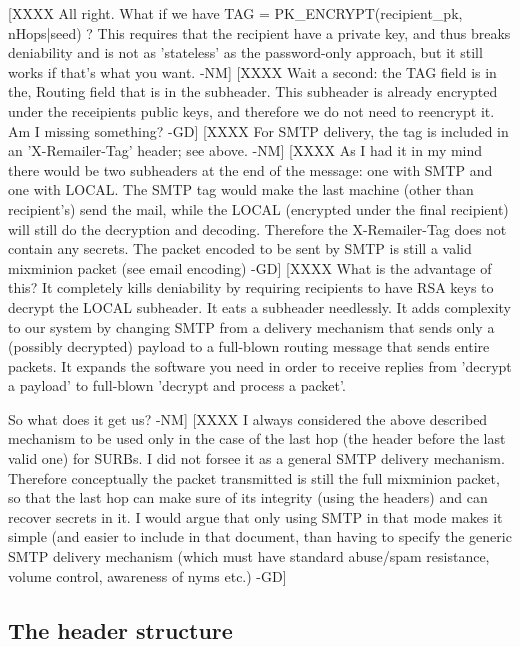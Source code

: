 [XXXX All right.  What if we have 
         TAG = PK_ENCRYPT(recipient_pk, nHops|seed) ?  
      This requires
      that the recipient have a private key, and thus breaks
      deniability and is not as 'stateless' as the password-only
      approach, but it still works if that's what you want.  -NM]
[XXXX Wait a second: the TAG field is in the, Routing field that is in the 
      subheader. This subheader is already encrypted under the receipients
      public keys, and therefore we do not need to reencrypt it.
      Am I missing something? -GD]
[XXXX For SMTP delivery, the tag is included in an 'X-Remailer-Tag'
      header; see above. -NM]
[XXXX As I had it in my mind there would be two subheaders at the end
         of the message: one with SMTP and one with LOCAL. The SMTP
         tag would make the last machine (other than recipient's) send
         the mail, while the LOCAL (encrypted under the final
         recipient) will still do the decryption and
         decoding. Therefore the X-Remailer-Tag does not contain any
         secrets. The packet encoded to be sent by SMTP is still a
         valid mixminion packet (see email encoding) -GD]
[XXXX What is the advantage of this?  It completely kills deniability
      by requiring recipients to have RSA keys to decrypt the LOCAL
      subheader.  It eats a subheader needlessly.  It adds
      complexity to our system by changing SMTP from a delivery
      mechanism that sends only a (possibly decrypted) payload to a
      full-blown routing message that sends entire packets.  It
      expands the software you need in order to receive replies from
      'decrypt a payload' to full-blown 'decrypt and process a packet'. 

      So what does it get us?  -NM]  
[XXXX I always considered the above described mechanism to be used
only in the case of the last hop (the header before the last valid
one) for SURBs. I did not forsee it as a general SMTP delivery
mechanism. Therefore conceptually the packet transmitted is still the
full mixminion packet, so that the last hop can make sure of its
integrity (using the headers) and can recover secrets in it. I would
argue that only using SMTP in that mode makes it simple (and easier to
include in that document, than having to specify the generic SMTP
delivery mechanism (which must have standard abuse/spam resistance,
volume control, awareness of nyms etc.) -GD]

\subsection{The header structure}

